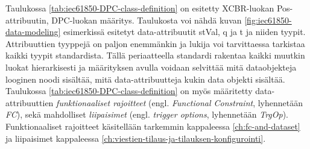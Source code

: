 Taulukossa \ref{tab:iec61850-DPC-class-definition} on esitetty XCBR-luokan Pos-attribuutin, DPC-luokan määritys. Taulukosta voi nähdä kuvan \ref{fig:iec61850-data-modeling} esimerkissä esitetyt data-attribuutit stVal, q ja t ja niiden tyypit. Attribuuttien tyyppejä on paljon enemmänkin ja lukija voi tarvittaessa tarkistaa kaikki tyypit standardista. Tällä periaatteella standardi rakentaa kaikki muutkin luokat hierarkisesti ja määrityksen avulla voidaan selvittää mitä dataobjekteja looginen noodi sisältää, mitä data-attribuutteja kukin data objekti sisältää. Taulukossa \ref{tab:iec61850-DPC-class-definition} on myös määritetty data-attribuuttien \emph{funktionaaliset rajoitteet} (engl. \emph{Functional Constraint}, lyhennetään \emph{FC}), sekä mahdolliset \emph{liipaisimet} (engl. \emph{trigger options}, lyhennetään \emph{TrgOp}). Funktionaaliset rajoitteet käsitellään tarkemmin kappaleessa \ref{ch:fc-and-dataset} ja liipaisimet kappaleessa \ref{ch:viestien-tilaus-ja-tilauksen-konfigurointi}.

